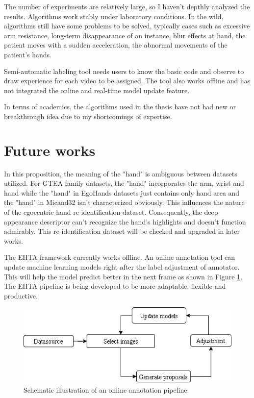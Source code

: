 The number of experiments are relatively large, so I haven’t depthly analyzed the results. Algorithms work stably under laboratory conditions. In the wild, algorithms still have some problems to be solved, typically cases such as excessive arm resistance, long-term disappearance of an instance, blur effects at hand, the patient moves with a sudden acceleration, the abnormal movements of the patient’s hands.

Semi-automatic labeling tool needs users to know the basic code and observe to draw experience for each video to be assigned. The tool also works offline and has not integrated the online and real-time model update feature.

In terms of academics, the algorithms used in the thesis have not had new or breakthrough idea due to my shortcomings of expertise.
\section{Future works} \label{sec:futurework}
In this proposition, the meaning of the "hand" is ambiguous between datasets utilized. For GTEA family datasets, the "hand" incorporates the arm, wrist and hand while the "hand" in EgoHands datasets just contains only hand area and the "hand" in Micand32 isn't characterized obviously. This influences the nature of the egocentric hand re-identification dataset. Consequently, the deep appearance descriptor can't recognize the hand's highlights and doesn't function admirably. This re-identification dataset will be checked and upgraded in later works.

The EHTA framework currently works offline. An online annotation tool can update machine learning models right after the label adjustment of annotator. This will help the model predict better in the next frame as shown in Figure \ref{fig:future}. The EHTA pipeline is being developed to be more adaptable, flexible and productive. 
\begin{figure}[htbp]
	\centerline{\includegraphics[width=0.5\textheight]{Figs/future.png}}
	\caption{Schematic illustration of an online annotation pipeline.}
	\label{fig:future}
\end{figure}

